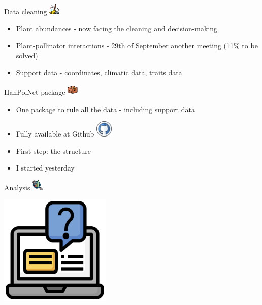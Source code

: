 \documentclass[
  ignorenonframetext,
  aspectratio=169,
]{beamer}
\begin{document}
\begin{frame}{}
\begin{block}{Data cleaning
\includegraphics[width=0.20833in,height=\textheight,keepaspectratio]{images/clipboard-2969939425.png}}
\label{data-cleaning}
\begin{itemize}
\item
  Plant abundances - now facing the cleaning and decision-making
\item
  Plant-pollinator interactions - 29th of September another meeting
  (11\% to be solved)
\item
  Support data - coordinates, climatic data, traits data
\end{itemize}
\end{block}

\begin{block}{HanPolNet package
\includegraphics[width=0.20833in,height=\textheight,keepaspectratio]{images/clipboard-3558150951.png}}
\label{hanpolnet-package}
\begin{itemize}
\item
  One package to rule all the data - including support data
\item
  Fully available at Github
  \href{https://github.com/Pollination-Ecology-Group/HanPolNet}{\includegraphics[width=0.3125in,height=\textheight,keepaspectratio]{images/clipboard-4080856661.png}}
\item
  First step: the structure
\item
  I started yesterday
\end{itemize}
\end{block}

\begin{block}{Analysis
\includegraphics[width=0.20833in,height=\textheight,keepaspectratio]{images/clipboard-229370691.png}}
\label{analysis}
\begin{center}
\includegraphics[width=2.08333in,height=\textheight,keepaspectratio]{images/clipboard-4279740602.png}
\end{center}
\end{block}


\end{frame}
\end{document}
